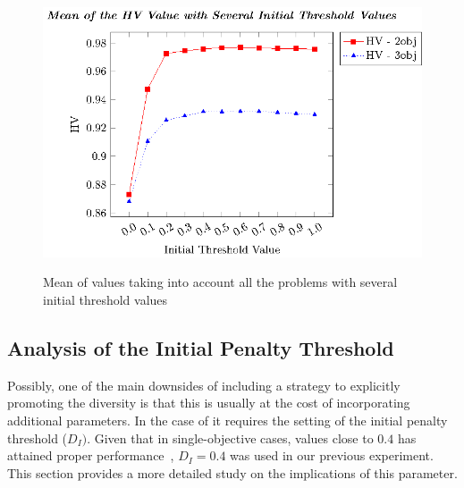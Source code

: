 \begin{figure}[t]
\centering
\includegraphics[scale=0.70]{images/Graphic-Initial-Distance_tikz-figure0.eps} \\
\caption{Mean of \HV{} values taking into account all the problems with several initial threshold values}\label{fig:Initial-distance-factor}
\end{figure}


\subsection{Analysis of the Initial Penalty Threshold}

Possibly, one of the main downsides of including a strategy to explicitly promoting the diversity 
is that this is usually at the cost of incorporating additional parameters.
%
In the case of \AVSDMOEAD{} it requires the setting of the initial penalty threshold ($D_I)$.
%
Given that in single-objective cases, values close to $0.4$ has attained proper performance~\cite{romero2018memetic,castillo2019differential},
$D_I = 0.4$ was used in our previous experiment.
%
This section provides a more detailed study on the implications of this parameter.
%

